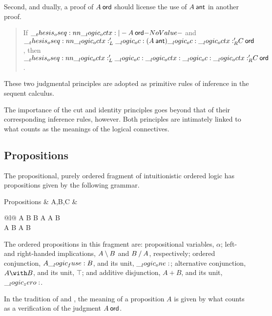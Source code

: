 Second, and dually, a proof of $A \ord$ should license the use of $A \ant$ in another proof.
\begin{quotation}
  If $\oseq{\octx |- A \ord}$ and $\oseq{\octx'_L \oc (A \ant) \oc \octx'_R |- C \ord}$, then $\oseq{\octx'_L \oc \octx \oc \octx'_R |- C \ord}$.
\end{quotation}

These two judgmental principles are adopted as primitive rules of inference in the sequent calculus.
The importance of the cut and identity principles goes beyond that of their corresponding inference rules, however.
Both principles are intimately linked to what counts as the meanings of the logical connectives.

\subsection{Propositions}

The propositional, purely ordered fragment of intuitionistic ordered logic has propositions given by the following grammar.
\begin{syntax*}
  Propositions &
    A,B,C & \begin{array}[t]{@{}l@{}}
              \alpha \mid A \limp B \mid B \pmir A
                \mid A \fuse B \mid \one \\
              \mathllap{\mid {}} A \with B \mid \top
                \mid A \plus B \mid \zero
            \end{array}
\end{syntax*}
The ordered propositions in this fragment are:
propositional variables, $\alpha$;
left- and right-handed implications, $A \mathbin { \setminus } B$ and $B \mathbin { / } A$, respectively;
ordered conjunction, $A \__logic_fuse: B$, and its unit, $\__logic_one:$;
alternative conjunction, $A \with B$, and its unit, $\top$;
and
additive disjunction, $A \plus B$, and its unit, $\__logic_zero:$.

In the tradition of \citeauthor{Gentzen:MZ35} and \citeauthor{Martin-Lof:NJPL96}\autocites{Gentzen:MZ35}{Martin-Lof:NJPL96}, the meaning of a proposition $A$ is given by what counts as a verification of the judgment $A \ord$.


